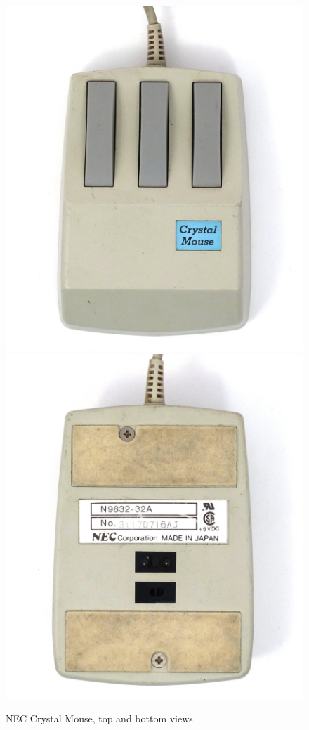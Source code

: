 \documentclass[11pt, a4paper]{article}
\begin{document}
\begin{figure}[h]
    \centering
    \includegraphics[scale=0.6]{1986_nec_crystal_mouse/nectop_60.jpg}
    \includegraphics[scale=0.6]{1986_nec_crystal_mouse/necbottom_60.jpg}
    \caption{NEC Crystal Mouse, top and bottom views}
    \label{NecCrystalTopAndBottom}
\end{figure}
\end{document}
